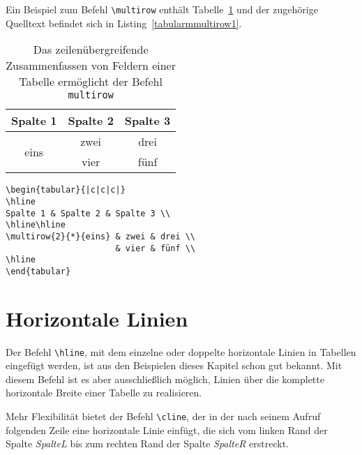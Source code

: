 Ein Beispiel zum Befehl \verb!\multirow!
enthält Tabelle~\ref{Tabelle_multirow1} und der zugehörige Quelltext befindet sich in Listing~\ref{tabularmmultirow1}.




\begin{table}[h!tb]
\centering
 \caption{Das zeilenübergreifende Zusammenfassen von Feldern einer Tabelle ermöglicht der Befehl \texttt{multirow}}
\label{Tabelle_multirow1}
\begin{tabular}{|c|c|c|}
\hline
Spalte 1 & Spalte 2 & Spalte 3 \\
\hline\hline
\multirow{2}{*}{eins} & zwei & drei \\
                      & vier & fünf \\
\hline
\end{tabular}
\end{table}


\begin{lstlisting}[caption={Mit dem Befehl \texttt{multirow} können Felder zeilenübergreifend zusammengefasst werden}, label=tabularmmultirow1, style=customlatex]
\begin{tabular}{|c|c|c|}
\hline
Spalte 1 & Spalte 2 & Spalte 3 \\
\hline\hline
\multirow{2}{*}{eins} & zwei & drei \\
                      & vier & fünf \\
\hline
\end{tabular}
\end{lstlisting}


\section{Horizontale Linien}

Der Befehl \verb!\hline!, mit dem einzelne oder doppelte horizontale Linien in Tabellen eingefügt werden, ist aus den Beispielen dieses Kapitel schon gut bekannt. Mit diesem Befehl ist es aber ausschließlich möglich, Linien über die komplette horizontale Breite einer Tabelle zu realisieren. 

Mehr Flexibilität bietet der Befehl \verb!\cline!, der in der nach seinem Aufruf folgenden Zeile eine horizontale Linie einfügt, die sich vom
linken Rand der Spalte \textsl{SpalteL} bis zum rechten Rand der 
Spalte \textsl{SpalteR} erstreckt.


